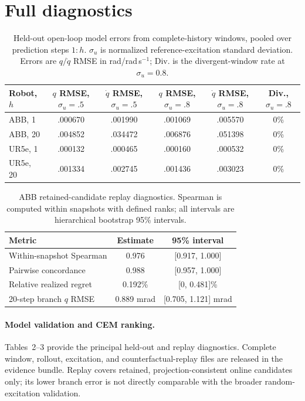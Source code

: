 \documentclass[10pt]{article}
\begin{document}
\section{Full diagnostics}
\begin{table}[h]
\centering\scriptsize
\caption{Held-out open-loop model errors from complete-history windows, pooled
over prediction steps $1{:}h$. $\sigma_u$ is normalized reference-excitation
standard deviation. Errors are $q/\dot q$ RMSE in rad/rad\,s$^{-1}$; Div. is
the divergent-window rate at $\sigma_u=0.8$.}
\setlength{\tabcolsep}{4pt}
\begin{tabular}{lccccc}
\toprule
Robot, $h$ & $q$ RMSE, $\sigma_u=.5$ & $\dot q$ RMSE, $\sigma_u=.5$ & $q$ RMSE, $\sigma_u=.8$ & $\dot q$ RMSE, $\sigma_u=.8$ & Div., $\sigma_u=.8$ \\
\midrule
ABB, 1 & .000670 & .001990 & .001069 & .005570 & 0\% \\
ABB, 20 & .004852 & .034472 & .006876 & .051398 & 0\% \\
UR5e, 1 & .000132 & .000465 & .000160 & .000532 & 0\% \\
UR5e, 20 & .001334 & .002745 & .001436 & .003023 & 0\% \\
\bottomrule
\end{tabular}
\end{table}

\begin{table}[h]
\centering\scriptsize
\caption{ABB retained-candidate replay diagnostics. Spearman is computed
within snapshots with defined ranks; all intervals are hierarchical bootstrap
95\% intervals.}
\setlength{\tabcolsep}{3pt}
\begin{tabular}{lcc}
\toprule
Metric & Estimate & 95\% interval \\
\midrule
Within-snapshot Spearman & 0.976 & [0.917, 1.000] \\
Pairwise concordance & 0.988 & [0.957, 1.000] \\
Relative realized regret & 0.192\% & [0, 0.481]\% \\
20-step branch $q$ RMSE & 0.889 mrad & [0.705, 1.121] mrad \\
\bottomrule
\end{tabular}
\end{table}

\paragraph{Model validation and CEM ranking.}
Tables~2--3 provide the principal held-out and replay diagnostics. Complete
window, rollout, excitation, and counterfactual-replay files are released in
the evidence bundle. Replay covers retained, projection-consistent online
candidates only; its lower branch error is not directly comparable with the
broader random-excitation validation.
\end{document}

